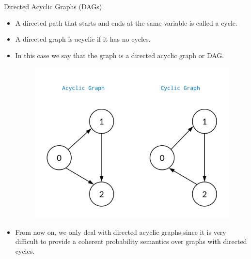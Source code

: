 \documentclass[handout]{beamer}
\begin{document}
\begin{frame}{Directed Acyclic Graphs (DAGs)}
\scriptsize{
\begin{itemize}
\item A directed path that starts and ends at the same variable is called a cycle.

\item A directed graph is acyclic if it has no cycles. 

\item In this case we say that the graph is a directed
acyclic graph or DAG. 


\begin{figure}[h!]
	\centering
	\includegraphics[scale=0.12]{pics/cycle.png}
	\end{figure} 



\item From now on, we only deal with directed acyclic graphs since it is very difficult to provide a coherent probability semantics over graphs with directed cycles.
 
 
 
\end{itemize}



} 

\end{frame}
\end{document}
